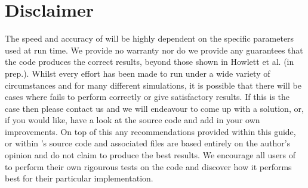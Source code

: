 \documentclass[12pt,twoside,a4paper]{article}
\begin{document}
\section{Disclaimer}
The speed and accuracy of {\PICOLA} will be highly dependent on the specific parameters used at run time. We provide no warranty nor do we provide any guarantees that the code produces the correct results, beyond those shown in Howlett et al. (in prep.). Whilst every effort has been made to run {\PICOLA} under a wide variety of circumstances and for many different simulations, it is possible that there will be cases where {\PICOLA} fails to perform correctly or give satisfactory results. If this is the case then please contact us and we will endeavour to come up with a solution, or, if you would like, have a look at the source code and add in your own improvements. On top of this any recommendations provided within this guide, or within {\PICOLA}'s source code and associated files are based entirely on the author's opinion and do not claim to produce the best results. We encourage all users of {\PICOLA} to perform their own rigourous tests on the code and discover how it performs best for their particular implementation. 
\end{document}
